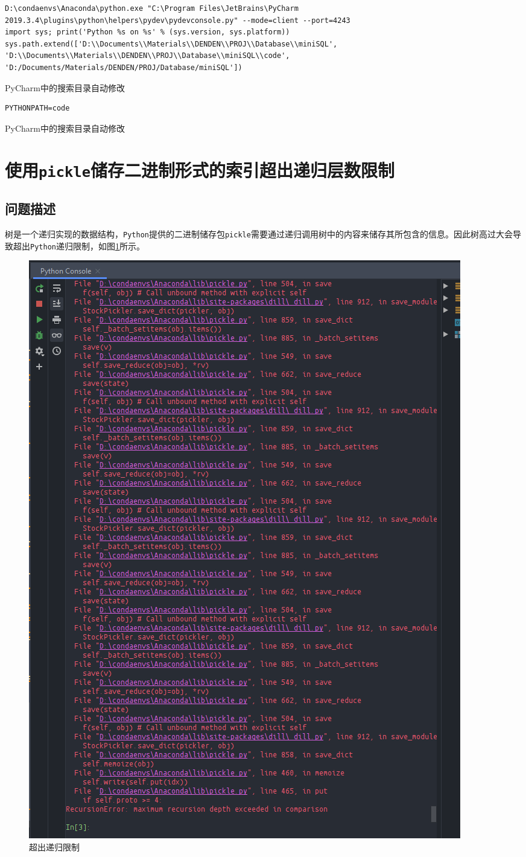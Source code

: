 \documentclass[UTF8]{ctexrep} %
\newenvironment{longlisting}{\captionsetup{type=listing}}{}
\begin{document}
\begin{longlisting}
    \begin{verbatim}
D:\condaenvs\Anaconda\python.exe "C:\Program Files\JetBrains\PyCharm 2019.3.4\plugins\python\helpers\pydev\pydevconsole.py" --mode=client --port=4243
import sys; print('Python %s on %s' % (sys.version, sys.platform))
sys.path.extend(['D:\\Documents\\Materials\\DENDEN\\PROJ\\Database\\miniSQL', 'D:\\Documents\\Materials\\DENDEN\\PROJ\\Database\\miniSQL\\code', 'D:/Documents/Materials/DENDEN/PROJ/Database/miniSQL']) 
    \end{verbatim}
    \caption{PyCharm中的搜索目录自动修改}
    \label{lst:path_append}
\end{longlisting}


\begin{longlisting}
    \begin{verbatim}
PYTHONPATH=code
    \end{verbatim}
    \caption{PyCharm中的搜索目录自动修改}
    \label{lst:manual_append}
\end{longlisting}

\section{使用\texttt{pickle}储存二进制形式的索引超出递归层数限制}
\subsection{问题描述}
树是一个递归实现的数据结构，\texttt{Python}提供的二进制储存包\texttt{pickle}需要通过递归调用树中的内容来储存其所包含的信息。因此树高过大会导致超出\texttt{Python}递归限制，如图\ref{fig:recursion_limit}所示。

\begin{figure}[H]
    \centering
    \includegraphics[width=0.4\linewidth]{figure/recursion_limit.png}
    \caption{超出递归限制}
    \label{fig:recursion_limit}
\end{figure}
\end{document}
